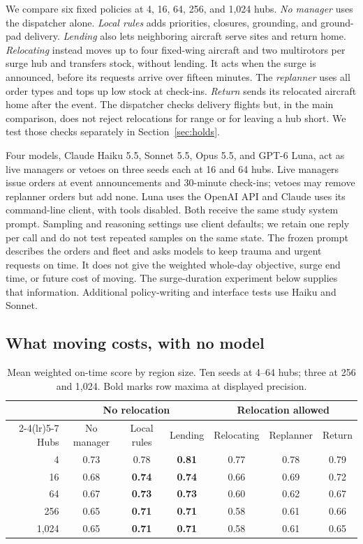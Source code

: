 \documentclass[letterpaper,10pt,conference]{ieeeconf}
\begin{document}
We compare six fixed policies at 4, 16, 64, 256, and 1,024 hubs.
\emph{No manager} uses the dispatcher alone. \emph{Local rules} adds
priorities, closures, grounding, and ground-pad delivery. \emph{Lending}
also lets neighboring aircraft serve sites and return home.
\emph{Relocating} instead moves up to four fixed-wing aircraft and two
multirotors per surge hub and transfers stock, without lending. It acts
when the surge is announced, before its requests arrive over fifteen
minutes. The \emph{replanner} uses all order types and tops up low stock
at check-ins. \emph{Return} sends its relocated aircraft home after the
event. The dispatcher checks delivery flights but, in the main comparison,
does not reject relocations for range or for leaving a hub short. We test
those checks separately in Section~\ref{sec:holds}.

Four models, Claude Haiku 5.5, Sonnet 5.5, Opus 5.5, and GPT-6 Luna,
act as live managers or vetoes on three seeds each at 16 and 64 hubs.
Live managers issue orders at event announcements and 30-minute check-ins;
vetoes may remove replanner orders but add none. Luna uses the OpenAI API
and Claude uses its command-line client, with tools disabled. Both receive
the same study system prompt. Sampling and reasoning settings use client
defaults; we retain one reply per call and do not test repeated samples
on the same state. The frozen prompt describes the orders and fleet and
asks models to keep trauma and urgent requests on time. It does not give
the weighted whole-day objective, surge end time, or future cost of moving.
The surge-duration experiment below supplies that information. Additional
policy-writing and interface tests use Haiku and Sonnet.

\subsection{What moving costs, with no model}
\label{sec:cost}

\begin{table}[t]
\caption{Mean weighted on-time score by region size. Ten seeds at 4--64
hubs; three at 256 and 1,024. Bold marks row maxima at displayed precision.}
\label{tab:policies}
\centering
\footnotesize
\setlength{\tabcolsep}{3pt}
\begin{tabular}{@{}rcccccc@{}}
\toprule
& \multicolumn{3}{c}{No relocation} & \multicolumn{3}{c}{Relocation allowed} \\
\cmidrule(lr){2-4}\cmidrule(lr){5-7}
Hubs & No manager & Local rules & Lending & Relocating & Replanner & Return \\
\midrule
4     & 0.73 & 0.78 & \textbf{0.81} & 0.77 & 0.78 & 0.79 \\
16    & 0.68 & \textbf{0.74} & \textbf{0.74} & 0.66 & 0.69 & 0.72 \\
64    & 0.67 & \textbf{0.73} & \textbf{0.73} & 0.60 & 0.62 & 0.67 \\
256   & 0.65 & \textbf{0.71} & \textbf{0.71} & 0.58 & 0.61 & 0.66 \\
1,024 & 0.65 & \textbf{0.71} & \textbf{0.71} & 0.58 & 0.61 & 0.65 \\
\bottomrule
\end{tabular}
\end{table}
\end{document}
